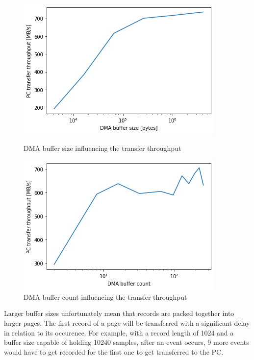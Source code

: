   \begin{figure}[H]
    \centering
    \begin{minipage}{.45\textwidth}
      \centering
      \includegraphics[width=\linewidth]{media/buffer_size_speed.png}
      \caption{DMA buffer size influencing the transfer throughput}
      \label{fig:buffer_size_speed}
    \end{minipage}%
    \hfill
    \begin{minipage}{.45\textwidth}
      \centering
      \includegraphics[width=\linewidth]{media/buffer_count_speed.png}
      \caption{DMA buffer count influencing the transfer throughput}
      \label{fig:buffer_count_speed}
    \end{minipage}
  \end{figure}

Larger buffer sizes unfortunately mean that records are packed together
into larger pages. The first record of a page will be transferred
with a significant delay in relation to its occurence.
For example, with a record length of 1024 and a buffer size capable
of holding 10240 samples, after an event occurs, 9 more events
would have to get recorded for the first one to get transferred to the PC.


